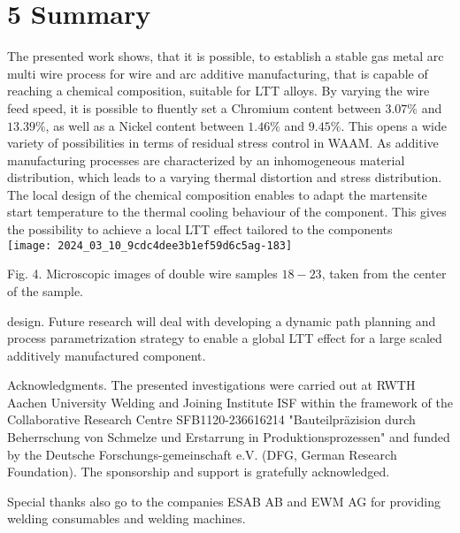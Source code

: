 \documentclass[10pt]{article}
\begin{document}
\section*{5 Summary}
The presented work shows, that it is possible, to establish a stable gas metal arc multi wire process for wire and arc additive manufacturing, that is capable of reaching a chemical composition, suitable for LTT alloys. By varying the wire feed speed, it is possible to fluently set a Chromium content between $3.07 \%$ and $13.39 \%$, as well as a Nickel content between $1.46 \%$ and $9.45 \%$. This opens a wide variety of possibilities in terms of residual stress control in WAAM. As additive manufacturing processes are characterized by an inhomogeneous material distribution, which leads to a varying thermal distortion and stress distribution. The local design of the chemical composition enables to adapt the martensite start temperature to the thermal cooling behaviour of the component. This gives the possibility to achieve a local LTT effect tailored to the components\\
\texttt{[image: 2024\_03\_10\_9cdc4dee3b1ef59d6c5ag-183]}

Fig. 4. Microscopic images of double wire samples $18-23$, taken from the center of the sample.

design. Future research will deal with developing a dynamic path planning and process parametrization strategy to enable a global LTT effect for a large scaled additively manufactured component.

Acknowledgments. The presented investigations were carried out at RWTH Aachen University Welding and Joining Institute ISF within the framework of the Collaborative Research Centre SFB1120-236616214 "Bauteilpräzision durch Beherrschung von Schmelze und Erstarrung in Produktionsprozessen" and funded by the Deutsche Forschungs-gemeinschaft e.V. (DFG, German Research Foundation). The sponsorship and support is gratefully acknowledged.

Special thanks also go to the companies ESAB AB and EWM AG for providing welding consumables and welding machines.
\end{document}
